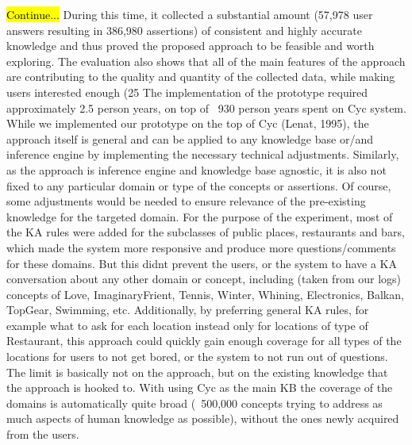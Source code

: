 \hl{Continue...}
During this time, it collected a substantial amount (57,978 user answers resulting in 386,980 assertions) of consistent and highly accurate knowledge and thus proved the proposed approach to be feasible and worth exploring. The evaluation also shows that all of the main features of the approach are contributing to the quality and quantity of the collected data, while making users interested enough (25%
The implementation of the prototype required approximately 2.5 person years, on top of ~930 person years spent on Cyc system. While we implemented our prototype on the top of Cyc (Lenat, 1995), the approach itself is general and can be applied to any knowledge base or/and inference engine by implementing the necessary technical adjustments. 
Similarly, as the approach is inference engine and knowledge base agnostic, it is also not fixed to any particular domain or type of the concepts or assertions. Of course, some adjustments would be needed to ensure relevance of the pre-existing knowledge for the targeted domain. For the purpose of the experiment, most of the KA rules were added for the subclasses of public places, restaurants and bars, which made the system more responsive and produce more questions/comments for these domains. But this didnt prevent the users, or the system to have a KA conversation about any other domain or concept, including (taken from our logs) concepts of Love, ImaginaryFrient, Tennis, Winter, Whining, Electronics, Balkan, TopGear, Swimming, etc. Additionally, by preferring general KA rules, for example what to ask for each location instead only for locations of type of Restaurant, this approach could quickly gain enough coverage for all types of the locations for users to not get bored, or the system to not run out of questions. The limit is basically not on the approach, but on the existing knowledge that the approach is hooked to. With using Cyc as the main KB the coverage of the domains is automatically quite broad (~500,000 concepts trying to address as much aspects of human knowledge as possible), without the ones newly acquired from the users.
